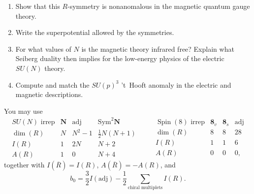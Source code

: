 \begin{enumerate}
\begin{enumerate}
    \item[(iv)] Show that this \(R\)-symmetry is nonanomalous in the
    magnetic quantum gauge theory.

    \item[(v)] Write the superpotential allowed by the symmetries.

    \item[(vi)] For what values of \(N\) is the magnetic theory infrared
    free?  Explain what Seiberg duality then implies for the low-energy
    physics of the electric \(SU(N)\) theory.

    \item[(vii)] Compute and match the \(SU(p)^3\) 't~Hooft anomaly in the
    electric and magnetic descriptions.
  \end{enumerate}

  You may use
  \[
  \begin{array}{c|ccc}
    SU(N)\text{ irrep}&\boldsymbol N&\mathrm{adj}&
       \mathrm{Sym}^2\boldsymbol N\\ \hline
    \dim(R)&N&N^2-1&\frac12N(N+1)\\
    I(R)&1&2N&N+2\\
    A(R)&1&0&N+4
  \end{array}
  \qquad
  \begin{array}{c|ccc}
    \operatorname{Spin}(8)\text{ irrep}&\boldsymbol8_v&\boldsymbol8_s&
       \mathrm{adj}\\ \hline
    \dim(R)&8&8&28\\
    I(R)&1&1&6\\
    A(R)&0&0&0,
  \end{array}
  \tag{29.15.3}
  \]
  together with \(I(\overline R)=I(R)\),
  \(A(\overline R)=-A(R)\), and
  \[
    b_0=\frac32I(\mathrm{adj})
      -\frac12\sum_{\text{chiral multiplets}}I(R).
    \tag{29.15.4}
  \]

\end{enumerate}
